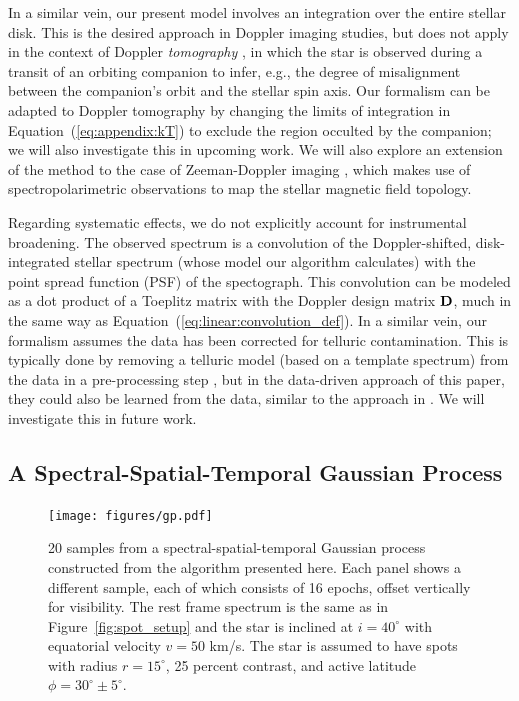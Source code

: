 \documentclass[modern]{aastex631}
\begin{document}
In a similar vein, our present model involves an integration over the entire stellar disk. 
This is the desired approach in Doppler imaging studies, but does not apply in the context of Doppler \emph{tomography} \citep[e.g.,][]{Johnson2017}, in which the star is observed during a transit of an orbiting companion to infer, e.g., the degree of misalignment between the companion's orbit and the stellar spin axis.
Our formalism can be adapted to Doppler tomography by changing the limits of integration in Equation~(\ref{eq:appendix:kT}) to exclude the region occulted by the companion; we will also investigate this in upcoming work.
%
We will also explore an extension of the method to the case of Zeeman-Doppler imaging \citep{Marsh1988}, which makes use of spectropolarimetric observations to map the stellar magnetic field topology.

Regarding systematic effects, we do not explicitly account for instrumental broadening. 
The observed spectrum is a convolution of the Doppler-shifted, disk-integrated stellar spectrum (whose model our algorithm calculates) with the point spread function (PSF) of the spectograph.
This convolution can be modeled as a dot product of a Toeplitz matrix with the Doppler design matrix ${\mathbf{D}}$, much in the same way as Equation~(\ref{eq:linear:convolution_def}).
In a similar vein, our formalism assumes the data has been corrected for telluric contamination. 
This is typically done by removing a telluric model (based on a template spectrum) from the data in a pre-processing step \citep[as in][]{Crossfield2014}, but in the data-driven approach of this paper, they could also be learned from the data, similar to the approach in \citet{Bedell2019}.
We will investigate this in future work.

\subsection{A Spectral-Spatial-Temporal Gaussian Process}
\label{sec:discussion:gp}

%
\begin{figure}[t!]
    \begin{centering}
        \texttt{[image: figures/gp.pdf]}
        \caption{%
            20 samples from a spectral-spatial-temporal Gaussian process constructed from the algorithm presented here.
            Each panel shows a different sample, each of which consists of 16 epochs, offset vertically for visibility.
            The rest frame spectrum is the same as in Figure~\ref{fig:spot_setup} and the star is inclined at $i = 40^\circ$ with equatorial velocity $v = 50$ km/s.
            The star is assumed to have spots with radius $r = 15^\circ$, 25 percent contrast, and active latitude $\phi = 30^\circ \pm 5^\circ$.
        }
        \label{fig:gp}
    \end{centering}
\end{figure}
%
\end{document}
